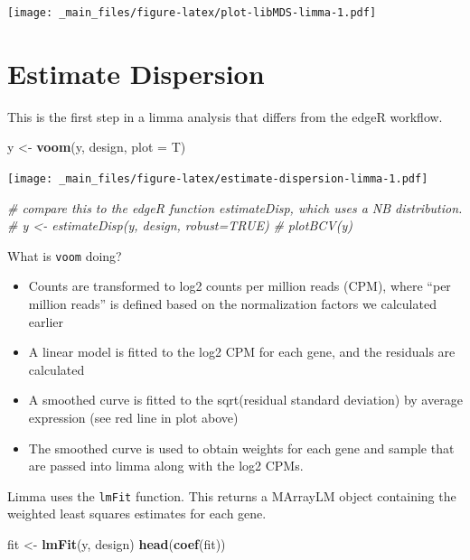 \documentclass[
]{book}
\newenvironment{Shaded}{\begin{snugshade}}{\end{snugshade}}
\newcommand{\AttributeTok}[1]{\textcolor[rgb]{0.13,0.29,0.53}{#1}}
\newcommand{\CommentTok}[1]{\textcolor[rgb]{0.56,0.35,0.01}{\textit{#1}}}
\newcommand{\FunctionTok}[1]{\textcolor[rgb]{0.13,0.29,0.53}{\textbf{#1}}}
\newcommand{\NormalTok}[1]{#1}
\newcommand{\OtherTok}[1]{\textcolor[rgb]{0.56,0.35,0.01}{#1}}
\begin{document}
\texttt{[image: \_main\_files/figure-latex/plot-libMDS-limma-1.pdf]}

\hypertarget{estimate-dispersion-1}{%
\section{Estimate Dispersion}\label{estimate-dispersion-1}}

This is the first step in a limma analysis that differs from the edgeR
workflow.

\begin{Shaded}
\begin{Highlighting}[]
\NormalTok{y }\OtherTok{\textless{}{-}} \FunctionTok{voom}\NormalTok{(y, design, }\AttributeTok{plot =}\NormalTok{ T)}
\end{Highlighting}
\end{Shaded}

\texttt{[image: \_main\_files/figure-latex/estimate-dispersion-limma-1.pdf]}

\begin{Shaded}
\begin{Highlighting}[]
\CommentTok{\# compare this to the edgeR function estimateDisp, which uses a NB distribution.}
\CommentTok{\# y \textless{}{-} estimateDisp(y, design, robust=TRUE)}
\CommentTok{\# plotBCV(y)}
\end{Highlighting}
\end{Shaded}

What is \texttt{voom} doing?

\begin{itemize}
\item
  Counts are transformed to log2 counts per million reads (CPM), where
  ``per million reads'' is defined based on the normalization factors we
  calculated earlier
\item
  A linear model is fitted to the log2 CPM for each gene, and the
  residuals are calculated
\item
  A smoothed curve is fitted to the sqrt(residual standard deviation)
  by average expression (see red line in plot above)
\item
  The smoothed curve is used to obtain weights for each gene and
  sample that are passed into limma along with the log2 CPMs.
\end{itemize}

Limma uses the \texttt{lmFit} function. This returns a MArrayLM object
containing the weighted least squares estimates for each gene.

\begin{Shaded}
\begin{Highlighting}[]
\NormalTok{fit }\OtherTok{\textless{}{-}} \FunctionTok{lmFit}\NormalTok{(y, design)}
\FunctionTok{head}\NormalTok{(}\FunctionTok{coef}\NormalTok{(fit))}
\end{Highlighting}
\end{Shaded}
\end{document}
